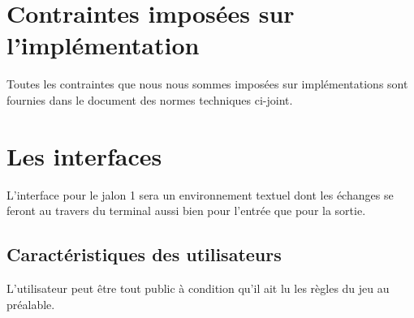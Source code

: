 \documentclass[12pt,a4paper]{article}
\begin{document}
	\section{Contraintes imposées sur l'implémentation}
		Toutes les contraintes que nous nous sommes imposées sur implémentations sont fournies dans le document des normes techniques ci-joint.
	\section{Les interfaces}
		L'interface pour le jalon 1 sera un environnement textuel dont les échanges se feront au travers du terminal aussi bien pour l'entrée que pour la sortie.
	\subsection{Caractéristiques des utilisateurs}
		L'utilisateur peut être tout public à condition qu'il ait lu les règles du jeu au préalable.
	
\end{document}

